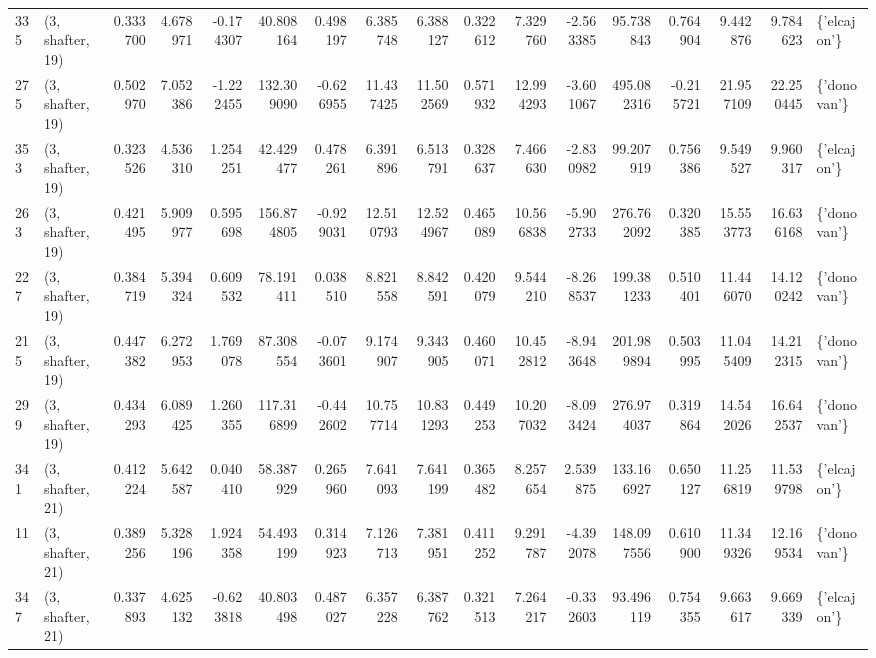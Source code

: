 \begin{tabular}{llrrrrrrrrrrrrrrl}
335 &  (3, shafter, 19) &   0.333700 &   4.678971 &  -0.174307 &    40.808164 &   0.498197 &   6.385748 &   6.388127 &  0.322612 &   7.329760 &  -2.563385 &    95.738843 &   0.764904 &   9.442876 &   9.784623 &  \{'elcajon'\} \\
275 &  (3, shafter, 19) &   0.502970 &   7.052386 &  -1.222455 &   132.309090 &  -0.626955 &  11.437425 &  11.502569 &  0.571932 &  12.994293 &  -3.601067 &   495.082316 &  -0.215721 &  21.957109 &  22.250445 &  \{'donovan'\} \\
353 &  (3, shafter, 19) &   0.323526 &   4.536310 &   1.254251 &    42.429477 &   0.478261 &   6.391896 &   6.513791 &  0.328637 &   7.466630 &  -2.830982 &    99.207919 &   0.756386 &   9.549527 &   9.960317 &  \{'elcajon'\} \\
263 &  (3, shafter, 19) &   0.421495 &   5.909977 &   0.595698 &   156.874805 &  -0.929031 &  12.510793 &  12.524967 &  0.465089 &  10.566838 &  -5.902733 &   276.762092 &   0.320385 &  15.553773 &  16.636168 &  \{'donovan'\} \\
227 &  (3, shafter, 19) &   0.384719 &   5.394324 &   0.609532 &    78.191411 &   0.038510 &   8.821558 &   8.842591 &  0.420079 &   9.544210 &  -8.268537 &   199.381233 &   0.510401 &  11.446070 &  14.120242 &  \{'donovan'\} \\
215 &  (3, shafter, 19) &   0.447382 &   6.272953 &   1.769078 &    87.308554 &  -0.073601 &   9.174907 &   9.343905 &  0.460071 &  10.452812 &  -8.943648 &   201.989894 &   0.503995 &  11.045409 &  14.212315 &  \{'donovan'\} \\
299 &  (3, shafter, 19) &   0.434293 &   6.089425 &   1.260355 &   117.316899 &  -0.442602 &  10.757714 &  10.831293 &  0.449253 &  10.207032 &  -8.093424 &   276.974037 &   0.319864 &  14.542026 &  16.642537 &  \{'donovan'\} \\
341 &  (3, shafter, 21) &   0.412224 &   5.642587 &   0.040410 &    58.387929 &   0.265960 &   7.641093 &   7.641199 &  0.365482 &   8.257654 &   2.539875 &   133.166927 &   0.650127 &  11.256819 &  11.539798 &  \{'elcajon'\} \\
11  &  (3, shafter, 21) &   0.389256 &   5.328196 &   1.924358 &    54.493199 &   0.314923 &   7.126713 &   7.381951 &  0.411252 &   9.291787 &  -4.392078 &   148.097556 &   0.610900 &  11.349326 &  12.169534 &  \{'donovan'\} \\
347 &  (3, shafter, 21) &   0.337893 &   4.625132 &  -0.623818 &    40.803498 &   0.487027 &   6.357228 &   6.387762 &  0.321513 &   7.264217 &  -0.332603 &    93.496119 &   0.754355 &   9.663617 &   9.669339 &  \{'elcajon'\} \\

\end{tabular}
